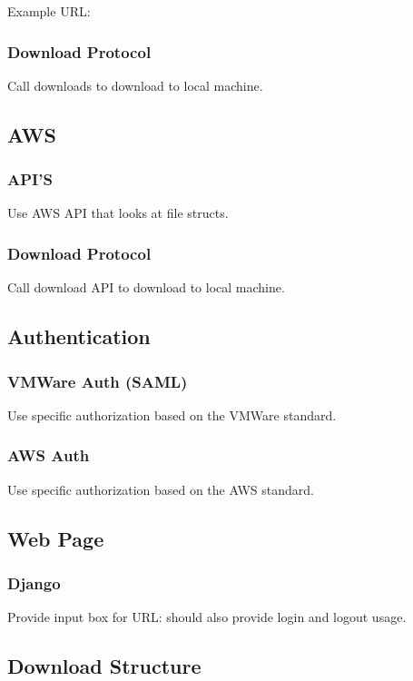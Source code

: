 \documentclass{article}
\begin{document}
            Example URL:

            \subsubsection{Download Protocol}
            Call downloads to download to local machine.

        \subsection{AWS}
            \subsubsection{API'S}
            Use AWS API that looks at file structs.

            \subsubsection{Download Protocol}
            Call download API to download to local machine.

        \subsection{Authentication}
            \subsubsection{VMWare Auth (SAML)}
            Use specific authorization based on the VMWare standard.

            \subsubsection{AWS Auth}
            Use specific authorization based on the AWS standard.

        \subsection{Web Page}
            \subsubsection{Django}
            Provide input box for URL: should also provide login and logout usage.

        \subsection{Download Structure}
\end{document}
